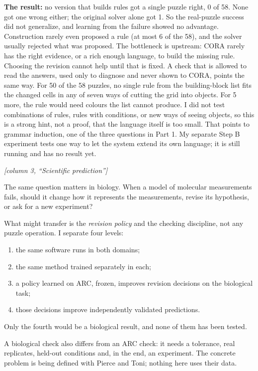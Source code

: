 \documentclass[11pt]{article}
\newcommand{\cue}[1]{{\color{ink2}\textit{[#1]}}\par}
\newcommand{\panel}[1]{\par\needspace{7\baselineskip}\vspace{0.7em}{\large\bfseries\color{accent}#1}\par\vspace{0.05em}}
\begin{document}
\textbf{The result:} no version that builds rules got a single puzzle right, 0 of 58. None got one wrong
either; the original solver alone got 1. So the real-puzzle success did not generalize, and learning from the
failure showed no advantage. Construction rarely even proposed a rule (at most 6 of the 58), and the
solver usually rejected what was proposed. The bottleneck is upstream: CORA rarely has the right evidence,
or a rich enough language, to build the missing rule. Choosing the revision cannot help until that is
fixed. A check that is allowed to read the answers, used only to diagnose and never shown to CORA, points the
same way. For 50 of the 58 puzzles, no single rule from the building-block list fits the changed cells in
any of seven ways of cutting the grid into objects. For 5 more, the rule would need colours the list cannot
produce. I did not test combinations of rules, rules with conditions, or new ways of seeing objects, so
this is a strong hint, not a proof, that the language itself is too small. That points to grammar
induction, one of the three questions in Part 1. My separate Step B experiment tests one way to let the
system extend its own language; it is still running and has no result yet.

\panel{13. From puzzles to science (proposed, not tested)}
\cue{column 3, ``Scientific prediction''}
The same question matters in biology. When a model of molecular measurements fails, should it change how
it represents the measurements, revise its hypothesis, or ask for a new experiment?

What might transfer is the \emph{revision policy} and the checking discipline, not any puzzle operation.
I separate four levels:
\begin{enumerate}
  \item the same software runs in both domains;
  \item the same method trained separately in each;
  \item a policy learned on ARC, frozen, improves revision decisions on the biological task;
  \item those decisions improve independently validated predictions.
\end{enumerate}
Only the fourth would be a biological result, and none of them has been tested.

A biological check also differs from an ARC check: it needs a tolerance, real replicates, held-out
conditions and, in the end, an experiment. The concrete problem is being defined with Pierce and Toni;
nothing here uses their data.
\end{document}
